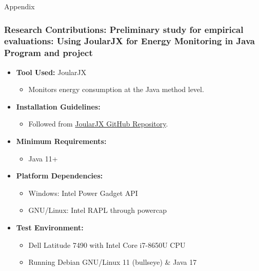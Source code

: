 \documentclass{beamer}
\begin{document}
\begin{frame}{Appendix}
\label{appendix}
\hypertarget{Preliminary_study}{}
\frametitle{Research Contributions: Preliminary study for empirical evaluations: Using JoularJX for Energy Monitoring in Java Program and project}

\begin{itemize}
    \item \textbf{Tool Used:} JoularJX
    \begin{itemize}
        \item Monitors energy consumption at the Java method level.
    \end{itemize}
    
    \item \textbf{Installation Guidelines:}
    \begin{itemize}
        \item Followed from \href{https://github.com/joular/joularjx}{JoularJX GitHub Repository}.
    \end{itemize}
    
    \item \textbf{Minimum Requirements:}
    \begin{itemize}
        \item Java 11+
    \end{itemize}
    
    \item \textbf{Platform Dependencies:}
    \begin{itemize}
        \item Windows: Intel Power Gadget API
        \item GNU/Linux: Intel RAPL through powercap
    \end{itemize}
    
    \item \textbf{Test Environment:}
    \begin{itemize}
        \item Dell Latitude 7490 with Intel Core i7-8650U CPU
        \item Running Debian GNU/Linux 11 (bullseye) \& Java 17
    \end{itemize}
\end{itemize}

\end{frame}

\end{document}
